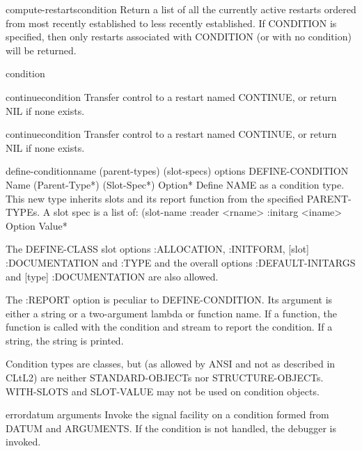 \begin{function}{compute-restarts}{\op condition}{}
  Return a list of all the currently active restarts ordered from most recently
established to less recently established. If CONDITION is specified, then only
restarts associated with CONDITION (or with no condition) will be returned.
\end{function}

\begin{condition-type}{condition}{}{}
  
\end{condition-type}

\begin{function}{continue}{\op condition}{}
  Transfer control to a restart named CONTINUE, or return NIL if none exists.
\end{function}

\begin{restart}{continue}{\op condition}{}
  Transfer control to a restart named CONTINUE, or return NIL if none exists.
\end{restart}

\begin{macro}{define-condition}{name (\rest parent-types) (\rest slot-specs) \body options}{}
  DEFINE-CONDITION Name (Parent-Type*) (Slot-Spec*) Option*
   Define NAME as a condition type. This new type inherits slots and its
   report function from the specified PARENT-TYPEs. A slot spec is a list of:
     (slot-name :reader <rname> :initarg <iname> {Option Value}*

   The DEFINE-CLASS slot options :ALLOCATION, :INITFORM, [slot] :DOCUMENTATION
   and :TYPE and the overall options :DEFAULT-INITARGS and
   [type] :DOCUMENTATION are also allowed.

   The :REPORT option is peculiar to DEFINE-CONDITION. Its argument is either
   a string or a two-argument lambda or function name. If a function, the
   function is called with the condition and stream to report the condition.
   If a string, the string is printed.

   Condition types are classes, but (as allowed by ANSI and not as described in
   CLtL2) are neither STANDARD-OBJECTs nor STRUCTURE-OBJECTs. WITH-SLOTS and
   SLOT-VALUE may not be used on condition objects.
\end{macro}

\begin{condition-type}{error}{datum \rest arguments}{}
  Invoke the signal facility on a condition formed from DATUM and ARGUMENTS.
  If the condition is not handled, the debugger is invoked.
\end{condition-type}

